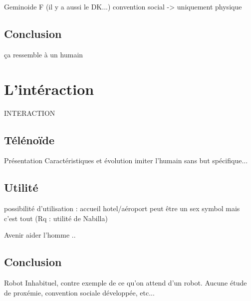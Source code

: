 \documentclass{beamer}
\begin{document}
\begin{frame}{Geminoide F}
  (il y a aussi le DK...)
  convention social -> uniquement physique
\end{frame}

\subsection{Conclusion}
\begin{frame}{ça ressemble à un humain}
\end{frame}

\section{L'intéraction}
\begin{frame}
  INTERACTION
\end{frame}

\subsection{Télénoïde}
\begin{frame}{Présentation}
  Caractéristiques et évolution
  imiter l'humain sans but spécifique...
\end{frame}

\subsection{Utilité}
\begin{frame}
  possibilité d'utilisation :
  accueil hotel/aéroport
  peut être un sex symbol mais c'est tout (Rq : utilité de Nabilla)
\end{frame}

\begin{frame}{Avenir}
  aider l'homme
  ..
\end{frame}

\subsection{Conclusion}
\begin{frame}
  Robot Inhabituel, contre exemple de ce qu'on attend d'un robot.
  Aucune étude de proxémie, convention sociale développée, etc...
\end{frame}
\end{document}
